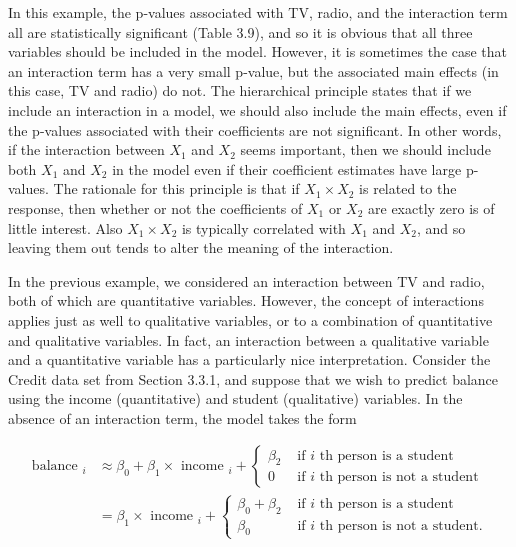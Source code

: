 \documentclass[10pt]{article}
\begin{document}
In this example, the p-values associated with TV, radio, and the interaction term all are statistically significant (Table 3.9), and so it is obvious that all three variables should be included in the model. However, it is sometimes the case that an interaction term has a very small p-value, but the associated main effects (in this case, TV and radio) do not. The hierarchical principle states that if we include an interaction in a model, we should also include the main effects, even if the p-values associated with their coefficients are not significant. In other words, if the interaction between $X_{1}$ and $X_{2}$ seems important, then we should include both $X_{1}$ and $X_{2}$ in the model even if their coefficient estimates have large p-values. The rationale for this principle is that if $X_{1} \times X_{2}$ is related to the response, then whether or not the coefficients of $X_{1}$ or $X_{2}$ are exactly zero is of little interest. Also $X_{1} \times X_{2}$ is typically correlated with $X_{1}$ and $X_{2}$, and so leaving them out tends to alter the meaning of the interaction.

In the previous example, we considered an interaction between TV and radio, both of which are quantitative variables. However, the concept of interactions applies just as well to qualitative variables, or to a combination of quantitative and qualitative variables. In fact, an interaction between a qualitative variable and a quantitative variable has a particularly nice interpretation. Consider the Credit data set from Section 3.3.1, and suppose that we wish to predict balance using the income (quantitative) and student (qualitative) variables. In the absence of an interaction term, the model takes the form


\begin{align*}
\text { balance }_{i} & \approx \beta_{0}+\beta_{1} \times \text { income }_{i}+ \begin{cases}\beta_{2} & \text { if } i \text { th person is a student } \\
0 & \text { if } i \text { th person is not a student }\end{cases} \\
& =\beta_{1} \times \text { income }_{i}+ \begin{cases}\beta_{0}+\beta_{2} & \text { if } i \text { th person is a student } \\
\beta_{0} & \text { if } i \text { th person is not a student. }\end{cases} \tag{3.34}
\end{align*}
\end{document}
